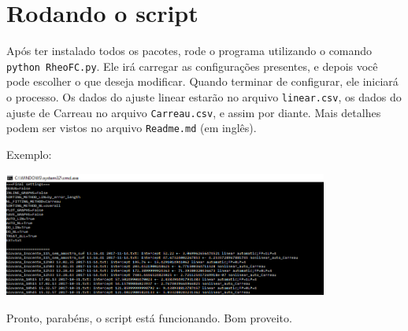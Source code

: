 \documentclass[a4paper, 12pt]{article}
\begin{document}
\section{Rodando o script}

Após ter instalado todos os pacotes, rode o programa utilizando o comando \texttt{python RheoFC.py}. Ele irá carregar as configurações presentes, e depois você pode escolher o que deseja modificar. Quando terminar de configurar, ele iniciará o processo. Os dados do ajuste linear estarão no arquivo \texttt{linear.csv}, os dados do ajuste de Carreau no arquivo \texttt{Carreau.csv}, e assim por diante. Mais detalhes podem ser vistos no arquivo \texttt{Readme.md} (em inglês).

Exemplo:

\begin{center}
\includegraphics[width = 0.8\textwidth]{RheoFC1}
\end{center}

Pronto, parabéns, o script está funcionando. Bom proveito.
\end{document}
